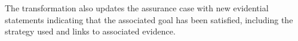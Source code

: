 The transformation also updates the assurance case with new evidential statements indicating that the associated goal has been satisfied, including 
the strategy used and links to associated evidence.  

%
%

%
